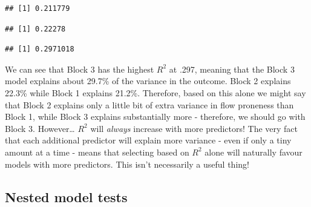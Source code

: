 \documentclass[
]{book}
\newenvironment{Shaded}{\begin{snugshade}}{\end{snugshade}}
\newcommand{\FunctionTok}[1]{\textcolor[rgb]{0.13,0.29,0.53}{\textbf{#1}}}
\newcommand{\NormalTok}[1]{#1}
\newcommand{\SpecialCharTok}[1]{\textcolor[rgb]{0.81,0.36,0.00}{\textbf{#1}}}
\begin{document}
\begin{Shaded}
\end{Shaded}

\begin{verbatim}
## [1] 0.211779
\end{verbatim}

\begin{Shaded}
\end{Shaded}

\begin{verbatim}
## [1] 0.22278
\end{verbatim}

\begin{Shaded}
\end{Shaded}

\begin{verbatim}
## [1] 0.2971018
\end{verbatim}

We can see that Block 3 has the highest \(R^2\) at .297, meaning that the Block 3 model explains about 29.7\% of the variance in the outcome. Block 2 explains 22.3\% while Block 1 explains 21.2\%. Therefore, based on this alone we might say that Block 2 explains only a little bit of extra variance in flow proneness than Block 1, while Block 3 explains substantially more - therefore, we should go with Block 3. However\ldots{} \(R^2\) will \emph{always} increase with more predictors! The very fact that each additional predictor will explain more variance - even if only a tiny amount at a time - means that selecting based on \(R^2\) alone will naturally favour models with more predictors. This isn't necessarily a useful thing!

\hypertarget{nested-model-tests}{%
\subsection{Nested model tests}\label{nested-model-tests}}
\end{document}
